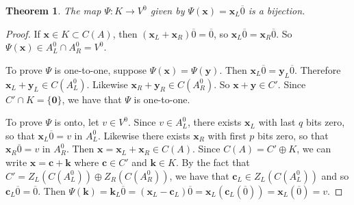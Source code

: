 \documentclass[12pt,twoside,singlespace]{article}
\numberwithin{equation}{section}
\newtheorem{thm}[equation]{Theorem}
\theoremstyle{definition}
\renewcommand{\vec}[1]{\mathbf{#1}}
\begin{document}
\begin{thm}
\label{thm:kv0}
The map $\Psi:K\to V^0$
given by $\Psi(\vec{x})=\vec{x}_L\overline{0}$ is a bijection.
\end{thm}
\begin{proof}
If $\vec{x}\in K\subset C(A)$, then $(\vec{x}_L+\vec{x}_R)\overline{0}=\overline{0}$, so $\vec{x}_L\overline{0}=\vec{x}_R\overline{0}$.  So $\Psi(\vec{x})\in A_L^0\cap A_R^0=V^0$.

To prove $\Psi$ is one-to-one, suppose $\Psi(\vec{x})=\Psi(\vec{y})$.  Then $\vec{x}_L\overline{0}=\vec{y}_L\overline{0}$.  Therefore $\vec{x}_L+\vec{y}_L\in C(A_L^0)$.  Likewise $\vec{x}_R+\vec{y}_R\in C(A_R^0)$.  So $\vec{x}+\vec{y}\in C'$.  Since $C'\cap K=\{\vec{0}\}$, we have that $\Psi$ is one-to-one.

To prove $\Psi$ is onto, let $v\in V^0$.  Since $v\in A_L^0$, there exists $\vec{x}_L$ with last $q$ bits zero, so that $\vec{x}_L\overline{0}=v$ in $A_L^0$.  Likewise there exists $\vec{x}_R$ with first $p$ bits zero, so that $\vec{x}_R\overline{0}=v$ in $A_R^0$.  Then $\vec{x}=\vec{x}_L+\vec{x}_R\in C(A)$.  Since $C(A)=C'\oplus K$, we can write $\vec{x}=\vec{c}+\vec{k}$ where $\vec{c}\in C'$ and $\vec{k}\in K$.  By the fact that $C'=Z_L(C(A_L^0))\oplus Z_R(C(A_R^0))$, we have that $\vec{c}_L\in Z_L(C(A_L^0))$ and so $\vec{c}_L\overline{0}=\overline{0}$.  Then
$\Psi(\vec{k})=\vec{k}_L\overline{0}
=(\vec{x}_L-\vec{c}_L)\overline{0}
=\vec{x}_L(\vec{c}_L(\overline{0}))
=\vec{x}_L(\overline{0})
=v.$
\end{proof}
\end{document}
